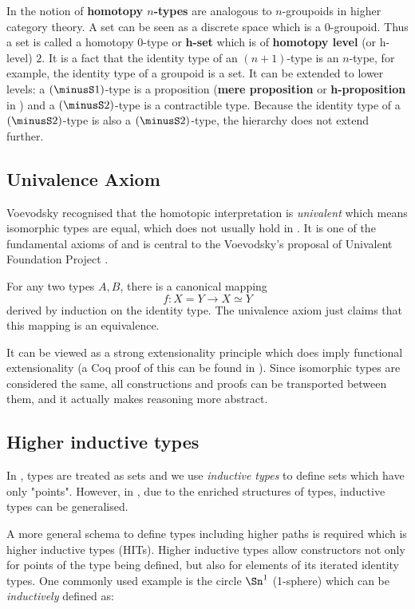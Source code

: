 In \hott the notion of \textbf{homotopy $n$-types} are analogous to $n$-groupoids in higher category theory. A set can be seen as a discrete space which is a $0$-groupoid. Thus a set is called a homotopy $0$-type or \textbf{h-set} which is of \textbf{homotopy level} (or h-level) $2$. It is a fact that the identity type of an $(n+1)$-type is an $n$-type, for example, the identity type of a groupoid is a set. It can be extended to lower levels: a $(\minusS 1)$-type is a proposition (\textbf{mere proposition} or \textbf{h-proposition} in \hott) and a $(\minusS 2)$-type is a contractible type. Because the identity type of a $(\minusS 2)$-type is also a $(\minusS 2)$-type, the hierarchy does not extend further.

\subsection{Univalence Axiom}\label{uaintro}

Voevodsky recognised that the homotopic interpretation is \emph{univalent} which means isomorphic types are equal, which does not usually hold in \itt. 
It is one of the fundamental axioms of \hott and is central to the Voevodsky's proposal of Univalent Foundation Project \cite{vv_uf}. 

For any two types $A, B$, there is a canonical mapping $$f : X = Y \to X \simeq Y$$ derived by induction on the identity type. The univalence axiom just claims that this mapping is an equivalence. 


It can be viewed as a strong extensionality principle which does imply functional extensionality (a Coq proof of this can be found in \cite{uafe}). 
Since isomorphic types are considered the same, all constructions and proofs can be transported between them, and it actually makes reasoning more abstract.


\subsection{Higher inductive types}\label{HITs}

In \itt, types are treated as sets and we use \emph{inductive types} to define sets which have only "points". However, in \hott, due to the enriched structures of types, inductive types can be generalised.

A more general schema to define types including higher paths is required which is higher inductive types (HITs). Higher inductive types allow constructors not only for points of the type being defined, but also for elements of its iterated identity types.
One commonly used example is the circle $\Sn^1$ (1-sphere) which can be \emph{inductively} defined as:

